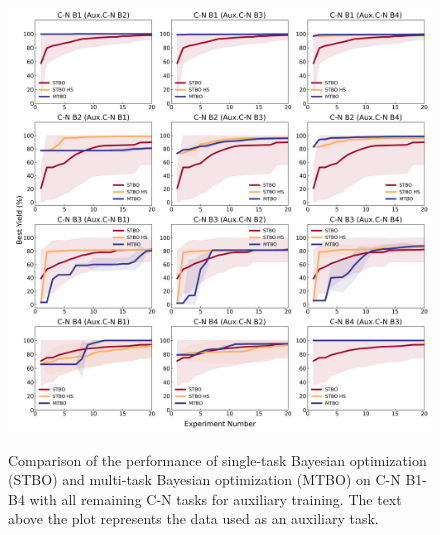 \begin{figure}
\caption{Comparison of the performance of single-task Bayesian optimization (STBO) and multi-task Bayesian optimization (MTBO) on C-N B1-B4 with all remaining C-N tasks for auxiliary training. The text above the plot represents the data used as an auxiliary task.}\includegraphics[width=1\textwidth]{gfx/Appendix/baumgartner_cn_baumgartner_cn_one_cotraining_optimization.png}
\label{fig:14}
\end{figure}
